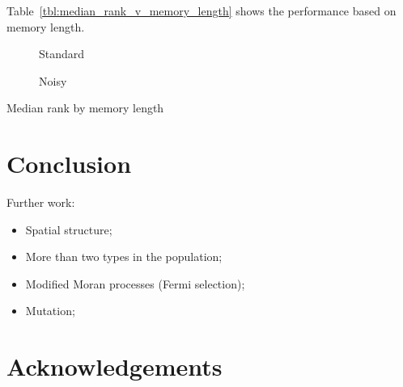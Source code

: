 \documentclass{article}
\begin{document}
Table~\ref{tbl:median_rank_v_memory_length} shows the performance based on
memory length.

\begin{table}[!hbtp]
    \centering
        \begin{subfigure}[t]{\textwidth}
            \centering
                
            \caption{Standard}
            \label{tbl:top_five_in_size_14_noisy}
        \end{subfigure}

        \begin{subfigure}[t]{\textwidth}
            \centering
                
            \caption{Noisy}
            \label{tbl:bottom_five_in_size_14_noisy}
        \end{subfigure}%
        \caption{Median rank by memory length}
        \label{tbl:median_rank_v_memory_length}
\end{table}




\section{Conclusion}\label{sec:conclusion}


Further work:

\begin{itemize}
    \item Spatial structure;
    \item More than two types in the population;
    \item Modified Moran processes (Fermi selection);
    \item Mutation;
\end{itemize}

\section*{Acknowledgements}
\end{document}
